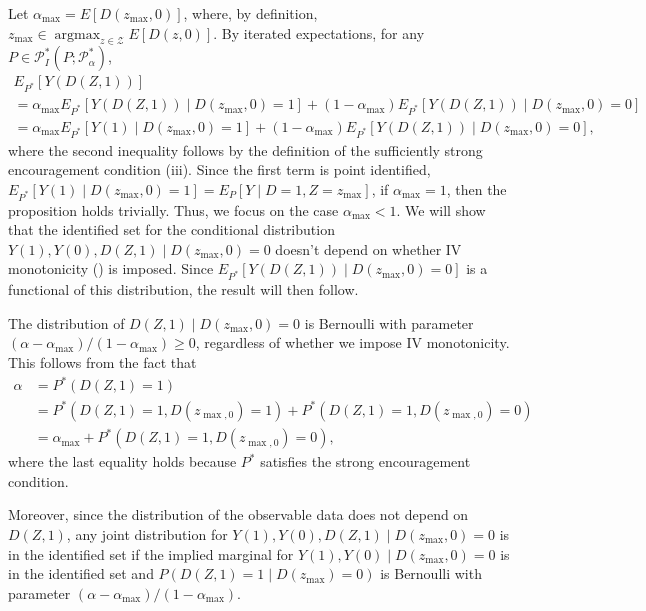 \documentclass[12pt]{article}%
\theoremstyle{definition}
\DeclareMathOperator*{\argmax}{argmax}
\newcommand\1{\operatorname{I}\indicatorfence}
\begin{document}
\begin{appendices}
Let $\alpha_{\max}=E[D(z_{\max}, 0)]$, where, by definition,
$z_{\max}\in\argmax_{z\in\mathcal{Z}} E[D(z,0)]$. By iterated expectations, for
any $P\in \mathcal{P}^*_{I}(P; \mathcal{P}_{\alpha}^*)$,
\begin{multline*}
  E_{P^{*}}[Y(D(Z, 1))]\\
  =\alpha_{\max}E_{P^{*}}[Y(D(Z,1))\mid D(z_{\max},0)=1]
  +(1-\alpha_{\max})E_{P^{*}}[Y(D(Z,1))\mid D(z_{\max},0)=0]\\
  =\alpha_{\max}E_{P^{*}}[Y(1)\mid D(z_{\max},0)=1]
  +(1-\alpha_{\max})E_{P^{*}}[Y(D(Z,1))\mid D(z_{\max},0)=0],
\end{multline*}
where the second inequality follows by the definition of the sufficiently strong
encouragement condition (iii). Since the first term is point identified,
$E_{P^{*}}[Y(1)\mid D(z_{\max},0)=1]=E_{P}[Y\mid D=1,Z=z_{\max}]$, if
$\alpha_{\max}=1$, then the proposition holds trivially. Thus, we focus on the
case $\alpha_{\max}<1$. We will show that the identified set for the conditional
distribution $Y(1), Y(0), D(Z,1)\mid D(z_{\max},0)=0$ doesn't depend on whether IV
monotonicity () is imposed. Since $E_{P^{*}}[Y(D(Z,1))\mid D(z_{\max},0)=0]$ is a
functional of this distribution, the result will then follow.


The distribution of $D(Z,1) \mid D(z_{\max},0)=0$ is Bernoulli with parameter
$(\alpha-\alpha_{\max})/(1-\alpha_{\max}) \geq 0$, regardless of whether we impose
IV monotonicity. This follows from the fact that
\begin{equation*}
  \begin{split}
    \alpha& = P^*(D(Z,1)=1) \\
          & = P^*(D(Z,1)=1, D(z_{\max,0})=1) + P^*(D(Z,1)=1, D(z_{\max,0})=0)\\
          & = \alpha_{\max} + P^*(D(Z,1)=1, D(z_{\max,0})=0),
  \end{split}
\end{equation*}
where the last equality holds because $P^*$ satisfies the strong encouragement
condition.

Moreover, since the distribution of the observable data does not depend on $D(Z,1)$, any joint distribution for $Y(1), Y(0), D(Z,1) \mid D(z_{\max},0) = 0$ is in the identified set if the implied marginal for $Y(1), Y(0) \mid D(z_{\max},0) = 0$ is in the identified set and $P(D(Z,1) = 1 \mid D(z_{\max}) =0) $ is Bernoulli with parameter $(\alpha-\alpha_{\max})/(1-\alpha_{\max})$.


\end{appendices}
\end{document}
